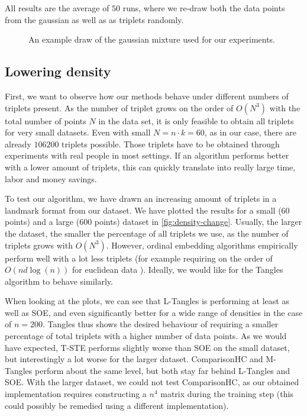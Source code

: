 All results are the average of $50$ runs, where we re-draw both the data points from the gaussian as well as as triplets randomly. 

\begin{figure}[ht]
    \centering
    \resizebox{0.8\textwidth}{!}{}
    \caption{An example draw of the gaussian mixture used for our experiments.}
    \label{fig:dataset-gauss}
\end{figure}

\subsection{Lowering density}\label{sec:lower-density}
First, we want to observe how our methods behave under different numbers of triplets present. As the number of triplet grows on the order of $O(N^3)$ with the total number of points $N$ in the data set, it is only feasible to obtain
all triplets for very small datasets. Even with small $N = n \cdot k = 60$, as in our case, there are already $106200$ triplets possible. Those triplets have to be obtained 
through experiments with real people in most settings. If an algorithm performs better with a lower amount
of triplets, this can quickly translate into really large time, labor and money savings. 

To test our algorithm, we have drawn an increasing amount of triplets in a landmark format 
from our dataset. 
We have plotted the results for a small (60 points) and a large
(600 points) dataset in \autoref{fig:density-change}. 
Usually, the larger the dataset, the smaller the percentage of all triplets we use, as the number of triplets grows with $O(N^3)$. However, ordinal embedding algorithms empirically perform well with a lot
less triplets (for example requiring on the order of $O(n d \log(n))$ for euclidean data \citep{jainFiniteSamplePrediction2016}). 
Ideally, we would like for the Tangles algorithm to behave similarly. 

When looking at the plots, we can see that L-Tangles is performing at least as well as SOE, and even significantly better for a wide range of densities in the case of $n=200$. Tangles thus shows the desired 
behaviour of requiring a smaller percentage of total triplets with a higher number of data points.
As we would have expected, T-STE performs slightly worse than SOE on the small dataset, but interestingly a lot worse for the larger dataset. ComparisonHC and M-Tangles
perform about the same level, but both stay far behind L-Tangles and SOE. With the larger dataset, we could not test ComparisonHC, as our obtained implementation requires 
constructing a $n^4$ matrix during the training step (this could possibly be remedied using a different implementation). 

